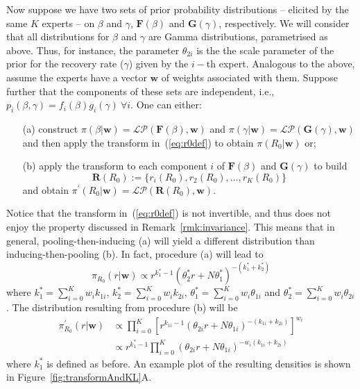 \documentclass[11pt]{article}
\begin{document}
Now suppose we have two sets of prior probability distributions -- elicited by the same $K$ experts -- on $\beta$ and $\gamma$, $\mathbf{F}(\beta)$ and $\mathbf{G}(\gamma)$, respectively.
We will consider that all distributions for $\beta$ and $\gamma$ are Gamma distributions, parametrised as above.
Thus, for instance, the parameter $\theta_{2i}$ is the the scale parameter of the prior for the recovery rate ($\gamma$) given by the $i-$th expert.
Analogous to the above, assume the experts have a vector $\mathbf{w}$ of weights associated with them.
Suppose further that the components of these sets are independent, i.e., $p_i(\beta, \gamma) = f_i(\beta)g_i(\gamma)\: \forall i$.
One can either:
\begin{itemize}
 \item[(a)] construct $\pi(\beta | \mathbf{w}) = \mathcal{LP}(\mathbf{F}(\beta), \mathbf{w})$ and $\pi(\gamma | \mathbf{w}) = \mathcal{LP}(\mathbf{G}(\gamma), \mathbf{w})$ and then apply the transform in~(\ref{eq:r0def}) to obtain $\pi(R_0| \mathbf{w})$ or;
 \item[(b)] apply the transform to each component $i$ of $\mathbf{F}(\beta)$ and $\mathbf{G}(\gamma)$ to build
 \[\mathbf{R}(R_0):= \{r_i(R_0), r_2(R_0), \ldots, r_K(R_0)\} \]
 and obtain $\pi^{\prime}(R_0|  \mathbf{w}) = \mathcal{LP}(\mathbf{R}(R_0),  \mathbf{w})$.
\end{itemize}
Notice that the transform in~(\ref{eq:r0def}) is not invertible, and thus does not enjoy the property discussed in Remark~\ref{rmk:invariance}.
This means that in general, pooling-then-inducing (a) will yield a different distribution than inducing-then-pooling (b).
In fact, procedure (a) will lead to
\begin{equation}
 \pi_{R_0}(r| \mathbf{w}) \propto   r^{k_{1}^{\ast}-1} (\theta_{2}^{\ast} r + N\theta_{1}^{\ast})^{-(k_{1}^{\ast} + k_{2}^{\ast})}
\end{equation}
where $k_{1}^{\ast} = \sum_{i=0}^K w_ik_{1i}$,  $k_{2}^{\ast} = \sum_{i=0}^K w_ik_{2i}$,  $\theta_{1}^{\ast} = \sum_{i=0}^K w_i\theta_{1i}$ and  $\theta_{2}^{\ast} = \sum_{i=0}^K w_i\theta_{2i}$.
The distribution resulting from procedure (b) will be 
\begin{align}
  \pi^{\prime}_{R_0}(r| \mathbf{w}) &\propto   \prod_{i=0}^K \left[ r^{k_{1i}-1} (\theta_{2i} r + N\theta_{1i})^{-(k_{1i} + k_{2i})} \right]^{w_i} \\
   &\propto r^{k_{1}^{\ast}-1}  \prod_{i=0}^K (\theta_{2i} r + N\theta_{1i})^{-w_{i}(k_{1i} + k_{2i})}
\end{align}
where $k_{1}^{\ast}$ is defined as before.
An example plot of the resulting densities is shown in Figure~\ref{fig:transformAndKL}A.
\end{document}
